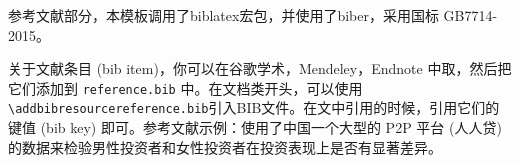 参考文献部分，本模板调用了biblatex宏包，并使用了biber，采用国标 GB7714-2015。

关于文献条目 (bib item)，你可以在谷歌学术，Mendeley，Endnote 中取，然后把它们添加到 \texttt{reference.bib} 中。在文档类开头，可以使用\texttt{\textbackslash addbibresource{reference.bib}}引入BIB文件。在文中引用的时候，引用它们的键值 (bib key) 即可。参考文献示例：\cite{cn1,en2,en3}使用了中国一个大型的 P2P 平台 (人人贷) 的数据来检验男性投资者和女性投资者在投资表现上是否有显著差异。